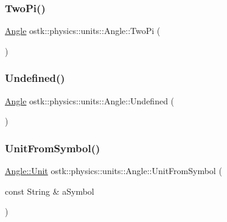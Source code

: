 \subsubsection{\texorpdfstring{Two\+Pi()}{TwoPi()}}
{\footnotesize\ttfamily \hyperlink{classostk_1_1physics_1_1units_1_1_angle}{Angle} ostk\+::physics\+::units\+::\+Angle\+::\+Two\+Pi (\begin{DoxyParamCaption}{ }\end{DoxyParamCaption})\hspace{0.3cm}{\ttfamily [static]}}

\mbox{\label{classostk_1_1physics_1_1units_1_1_angle_abfde70c3cfb9fa966ee91d498092766a}} 
\subsubsection{\texorpdfstring{Undefined()}{Undefined()}}
{\footnotesize\ttfamily \hyperlink{classostk_1_1physics_1_1units_1_1_angle}{Angle} ostk\+::physics\+::units\+::\+Angle\+::\+Undefined (\begin{DoxyParamCaption}{ }\end{DoxyParamCaption})\hspace{0.3cm}{\ttfamily [static]}}

\mbox{\label{classostk_1_1physics_1_1units_1_1_angle_a754e7c95f024bc77fa69c58b0d02fd87}} 
\subsubsection{\texorpdfstring{Unit\+From\+Symbol()}{UnitFromSymbol()}}
{\footnotesize\ttfamily \hyperlink{classostk_1_1physics_1_1units_1_1_angle_aea1f8018b1d378b9dee56959d8eb9def}{Angle\+::\+Unit} ostk\+::physics\+::units\+::\+Angle\+::\+Unit\+From\+Symbol (\begin{DoxyParamCaption}\item[{const String \&}]{a\+Symbol }\end{DoxyParamCaption})\hspace{0.3cm}{\ttfamily [static]}}

